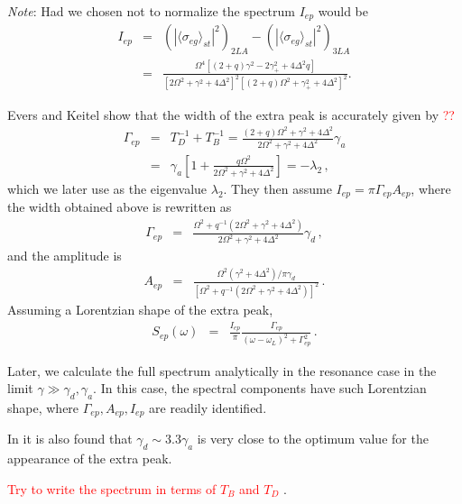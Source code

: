 \documentclass[twocolumn,aps,eqsecnum,showkeys,amsmath]{revtex4-2}
\begin{document}
\textit{Note}: Had we chosen not to normalize the spectrum $I_{ep}$ 
would be 
%
\begin{eqnarray} 	\label{eq:I_narrowpeak}
I_{ep} &=& \left( |\langle \sigma_{eg} \rangle_{st} |^2 \right)_{2LA}
	- \left( |\langle \sigma_{eg} \rangle_{st} |^2 \right)_{3LA} 	 \\ 
&=& \frac{ \Omega^4 [(2+q) \gamma^2 -2\gamma_+^2 +4\Delta^2 q ]}
	{[2\Omega^2 +\gamma^2 +4\Delta^2 ]^2
	[(2+q)\Omega^2 +\gamma_+^2 +4\Delta^2 ]^2 }  . \nonumber 	
\end{eqnarray}

Evers and Keitel \cite{EvKe02} show that the width of the extra peak is 
accurately given by \textcolor{red}{??}
%
\begin{eqnarray} 	\label{eq:widthextra}
\Gamma_{ep} &=& T_D^{-1} +T_B^{-1} 	
	= \frac{ (2+q)\Omega^2 +\gamma^2 +4\Delta^2 }
	{2\Omega^2 +\gamma^2 +4\Delta^2} \gamma_a 	\nonumber \\ 
&=& \gamma_a \left[ 1+ \frac{ q\Omega^2 }
	{2\Omega^2 +\gamma^2 +4\Delta^2}  \right] = - \lambda_2 	\,, 
\end{eqnarray}
which we later use as the eigenvalue $\lambda_2$. They then assume 
$I_{ep} =\pi \Gamma_{ep} A_{ep}$, where the width obtained above is 
rewritten as 
%
\begin{eqnarray}
\Gamma_{ep} &=& 
	\frac{ \Omega^2 +q^{-1}(2\Omega^2 +\gamma^2 +4\Delta^2)}
	{2\Omega^2 +\gamma^2 +4\Delta^2} \gamma_d 	\,, 	 
\end{eqnarray}
and the amplitude is 
%
\begin{eqnarray}
A_{ep} &=& \frac{ \Omega^2 ( \gamma^2 +4\Delta^2 )/\pi \gamma_d }
	{ [ \Omega^2 +q^{-1}(2\Omega^2 +\gamma^2 +4\Delta^2) ]^2 }  \,. 	
\end{eqnarray}
Assuming a Lorentzian shape of the extra peak, 
%
\begin{eqnarray}
S_{ep}(\omega) &=& \frac{I_{ep}}{\pi} \frac{\Gamma_{ep}}
	{(\omega -\omega_L)^2 +\Gamma_{ep}^2} 	\,.
\end{eqnarray}

Later, we calculate the full spectrum analytically in the resonance case in
the limit $\gamma \gg \gamma_d, \gamma_a$. In this case, the spectral 
components have such Lorentzian shape, where 
$\Gamma_{ep}, A_{ep},I_{ep}$ are readily identified.  

In \cite{EvKe02} it is also found that $\gamma_d \sim 3.3 \gamma_a$ 
is very close to the optimum value for the appearance of the extra peak. 

\textcolor{red}{Try to write the spectrum in terms of $T_B$ and $T_D$} 
\cite{HePl95}.
\end{document}
